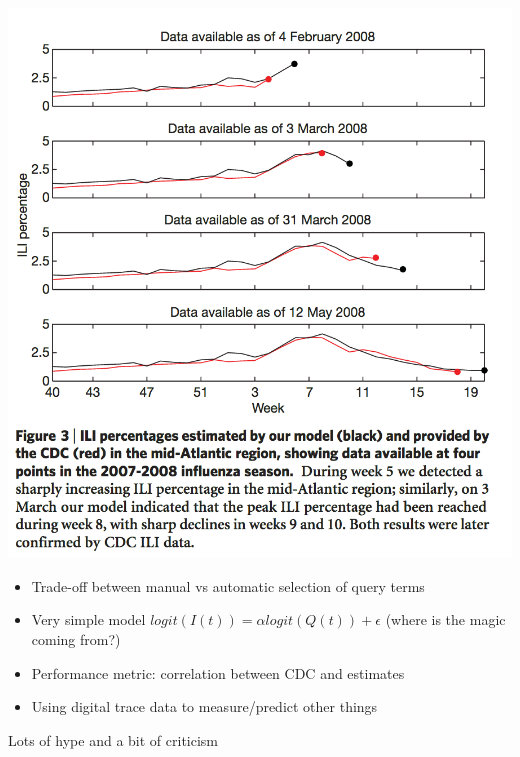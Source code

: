 \documentclass[aspectratio=169]{beamer}
\begin{document}
\begin{frame}

\begin{center}
  \includegraphics[height = 0.9\textheight]{figures/ginsberg_detecting_2009_fig3}
\end{center}

\end{frame}
\begin{frame}

\begin{itemize}
\item Trade-off between manual vs automatic selection of query terms
\pause
\item Very simple model $logit(I(t)) = \alpha logit(Q(t)) + \epsilon$ (where is the magic coming from?)
\pause
\item Performance metric: correlation between CDC and estimates
\pause
\item Using digital trace data to measure/predict other things
\end{itemize}

\end{frame}
\begin{frame}

Lots of hype and a bit of criticism

\end{frame}
\end{document}
